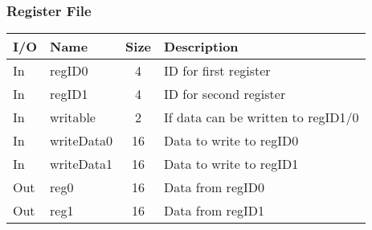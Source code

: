 \documentclass{article}
\begin{document}
		\subsubsection{Register File}
			\begin{center} \begin{tabular}{| l | l | c | l |} \hline 
				I/O & Name      & Size & Description \\ \hline 
				In  & regID0    & 4    & ID for first register \\ \hline
				In  & regID1    & 4    & ID for second register \\ \hline
				In  & writable  & 2    & If data can be written to regID1/0\\ \hline
				In  & writeData0 & 16   & Data to write to regID0 \\ \hline
				In  & writeData1 & 16   & Data to write to regID1 \\ \hline
				Out & reg0      & 16   & Data from regID0 \\ \hline
				Out & reg1      & 16   & Data from regID1 \\ \hline
			\end{tabular} \end{center}
\end{document}
